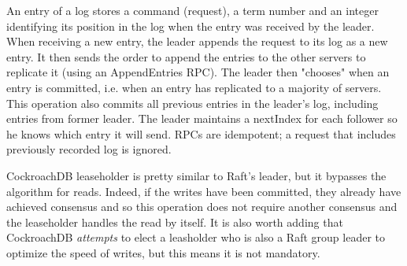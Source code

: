An entry of a log stores a command (request), a term number and an integer identifying its position in the log when the entry was received by the leader. When receiving a new entry, the leader appends the request to its log as a new entry. It then sends the order to append the entries to the other servers to replicate it (using an AppendEntries RPC). The leader then "chooses" when an entry is committed, i.e. when an entry has replicated to a majority of servers. This operation also commits all previous entries in the leader's log, including entries from former leader. The leader maintains a nextIndex for each follower so he knows which entry it will send. RPCs are idempotent; a request that includes previously recorded log is ignored.


CockroachDB leaseholder is pretty similar to Raft's leader, but it bypasses the algorithm for reads. Indeed, if the writes have been committed, they already have achieved consensus and so this operation does not require another consensus and the leaseholder handles the read by itself. It is also worth adding that CockroachDB \emph{attempts} to elect a leasholder who is also a Raft group leader to optimize the speed of writes, but this means it is not mandatory\cite{CRDB:replication-layer}.

